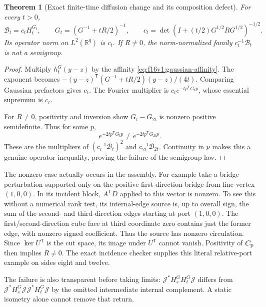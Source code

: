 \documentclass[11pt,oneside]{article}
\newtheorem{theorem}{Theorem}[section]
\begin{document}
\begin{theorem}[Exact finite-time diffusion change and its composition defect]
\label{f16v1:heat}
For every \(t>0\),
\begin{equation}
 \mathcal B_t=c_t H_t^{G_t},\qquad
 G_t=(G^{-1}+tR/2)^{-1},\qquad
 c_t=\det(I+(t/2)G^{1/2}RG^{1/2})^{-1/2}.
 \label{f16v1:heat-factor}
\end{equation}
Its operator norm on \(L^2(\mathbb R^q)\) is \(c_t\).
If \(R\ne0\), the norm-normalized family
\(c_t^{-1}\mathcal B_t\) is not a semigroup.
\end{theorem}

\begin{proof}
Multiply \(h_t^G(y-z)\) by the affinity
\eqref{eq:f16v1:gaussian-affinity}.
The exponent becomes
\(-(y-z)^{\mathsf T}(G^{-1}+tR/2)(y-z)/(4t)\).
Comparing Gaussian prefactors gives \(c_t\).
The Fourier multiplier is
\(c_t e^{-t p^{\mathsf T}G_t p}\), whose essential supremum is
\(c_t\).

For \(R\ne0\), positivity and inversion show
\(G_t-G_{2t}\) is nonzero positive semidefinite.
Thus for some \(p\),
\[
 e^{-2t p^{\mathsf T}G_t p}
                   \ne e^{-2t p^{\mathsf T}G_{2t}p}.
\]
These are the multipliers of
\((c_t^{-1}\mathcal B_t)^2\) and
\(c_{2t}^{-1}\mathcal B_{2t}\). Continuity in \(p\) makes this
a genuine operator inequality, proving the failure of the
semigroup law.
\end{proof}

The nonzero case actually occurs in the assembly.
For example take a bridge perturbation supported only on
the positive first-direction bridge from fine vertex \((1,0,0)\).
In its incident block, \(A^{\mathsf T}D\) applied to this vector
is nonzero. To see this without a numerical rank test, its
internal-edge source is, up to overall sign, the sum of the
second- and third-direction edges starting at port \((1,0,0)\).
The first/second-direction cube face at third coordinate zero
contains just the former edge, with nonzero signed coefficient.
Thus the source has nonzero circulation. Since
\(\ker U^{\mathsf T}\) is the cut space, its image under
\(U^{\mathsf T}\) cannot vanish. Positivity of \(C_{\rm p}\)
then implies \(R\ne0\).
The exact incidence checker supplies this literal relative-port
example on sides eight and twelve.

The failure is also transparent before taking limits:
\(\mathcal J^*H_s^G H_t^G\mathcal J\) differs from
\(\mathcal J^*H_s^G\mathcal J\mathcal J^*H_t^G\mathcal J\)
by the omitted intermediate internal complement.
A static isometry alone cannot remove that return.
\end{document}

